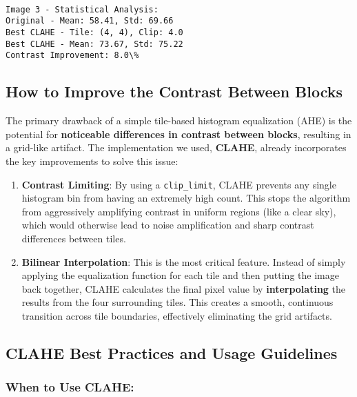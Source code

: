 \documentclass[11pt]{article}
\begin{document}
    \begin{Verbatim}[commandchars=\\\{\}]

Image 3 - Statistical Analysis:
Original - Mean: 58.41, Std: 69.66
Best CLAHE - Tile: (4, 4), Clip: 4.0
Best CLAHE - Mean: 73.67, Std: 75.22
Contrast Improvement: 8.0\%
    \end{Verbatim}

    \hypertarget{how-to-improve-the-contrast-between-blocks}{%
\subsection{How to Improve the Contrast Between
Blocks}\label{how-to-improve-the-contrast-between-blocks}}

The primary drawback of a simple tile-based histogram equalization (AHE)
is the potential for \textbf{noticeable differences in contrast between
blocks}, resulting in a grid-like artifact. The implementation we used,
\textbf{CLAHE}, already incorporates the key improvements to solve this
issue:

\begin{enumerate}
\def\labelenumi{\arabic{enumi}.}
\item
  \textbf{Contrast Limiting}: By using a \texttt{clip\_limit}, CLAHE
  prevents any single histogram bin from having an extremely high count.
  This stops the algorithm from aggressively amplifying contrast in
  uniform regions (like a clear sky), which would otherwise lead to
  noise amplification and sharp contrast differences between tiles.
\item
  \textbf{Bilinear Interpolation}: This is the most critical feature.
  Instead of simply applying the equalization function for each tile and
  then putting the image back together, CLAHE calculates the final pixel
  value by \textbf{interpolating} the results from the four surrounding
  tiles. This creates a smooth, continuous transition across tile
  boundaries, effectively eliminating the grid artifacts.
\end{enumerate}

    \hypertarget{clahe-best-practices-and-usage-guidelines}{%
\subsection{CLAHE Best Practices and Usage
Guidelines}\label{clahe-best-practices-and-usage-guidelines}}

\hypertarget{when-to-use-clahe}{%
\subsubsection{When to Use CLAHE:}\label{when-to-use-clahe}}
\end{document}
